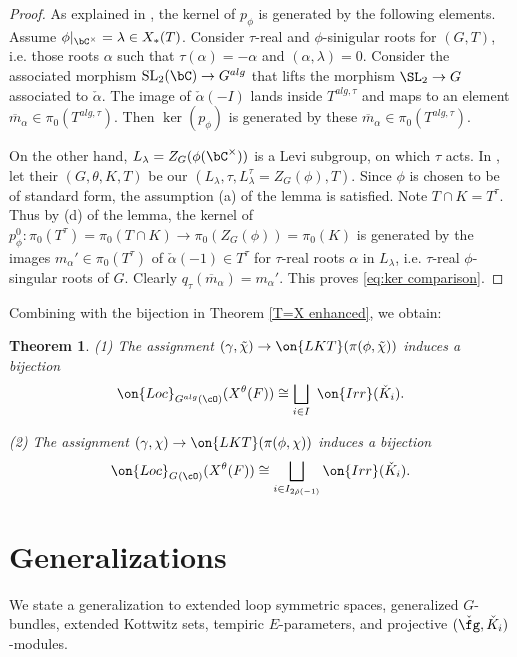 \documentclass[12pt]{amsart}
\newtheorem{thm}{Theorem}
\theoremstyle{remark}
\begin{document}
\begin{proof}
   As explained in \cite[\S4.4]{AA}, the kernel of $p_\phi$
   is generated by the following elements.
   Assume $\phi|_{\bC^\times}=\lambda\in X_*(T)$.
   Consider $\tau$-real and $\phi$-sinigular roots for $(G,T)$,
   i.e. those roots $\alpha$ such that
   $\tau(\alpha)=-\alpha$ and $(\alpha,\lambda)=0$.
   Consider the associated morphism 
   $\mathrm{SL}_2(\bC)\rightarrow G^{alg}$
   that lifts the morphism $\SL_2\rightarrow G$
   associated to $\check{\alpha}$.
   The image of $\check\alpha(-I)$ lands inside $T^{alg,\tau}$
   and maps to an element $\overline{m}_\alpha\in\pi_0(T^{alg,\tau})$.
   Then $\ker(p_\phi)$ is generated by these $\overline{m}_\alpha\in\pi_0(T^{alg,\tau})$.

   On the other hand, 
   $L_\lambda=Z_G(\phi(\bC^\times))$ is a Levi subgroup, 
   on which $\tau$ acts.
   In \cite[Lemma 12.10]{ABV},
   let their $(G,\theta,K,T)$ be our 
   $(L_\lambda,\tau, L_\lambda^\tau=Z_G(\phi),T)$.
   Since $\phi$ is chosen to be of standard form,
   the assumption (a) of the lemma is satisfied. 
   Note $T\cap K=T^\tau$.
   Thus by (d) of the lemma, the kernel of
   $p_\phi^0:\pi_0(T^\tau)=\pi_0(T\cap K)\rightarrow\pi_0(Z_G(\phi))=\pi_0(K)$
   is generated by the images $m_\alpha'\in\pi_0(T^\tau)$
   of $\check{\alpha}(-1)\in T^\tau$
   for $\tau$-real roots $\alpha$ in $L_\lambda$,
   i.e. $\tau$-real $\phi$-singular roots of $G$.
   Clearly $q_\tau(\overline{m}_\alpha)=m_\alpha'$.
   This proves \eqref{eq:ker comparison}.
\end{proof}


Combining with the bijection 
in Theorem \ref{T=X enhanced}, we obtain:

\begin{thm}\label{K types}
    (1) The assignment $(\gamma,\tilde\chi)\to\on{LKT}(\pi(\phi,\tilde\chi))$
    induces a bijection
    \[\on{Loc}_{G^{alg}(\cO)}(X^\theta(F))\cong\bigsqcup_{i\in I}\ \on{Irr}(\check K_i).\]

       (2) The assignment $(\gamma,\chi)\to\on{LKT}(\pi(\phi,\chi))$
    induces a bijection
    \[\on{Loc}_{G^{}(\cO)}(X^\theta(F))\cong\bigsqcup_{i\in I_{2\check\rho(-1)}}\on{Irr}(\check K_i).\]
\end{thm}


\section{Generalizations}\label{generalizations}
We state a generalization to 
extended loop symmetric spaces, generalized 
$G$-bundles, 
extended Kottwitz sets, tempiric $E$-parameters, and 
projective $(\check\fg,\check K_i)$-modules.
\end{document}
